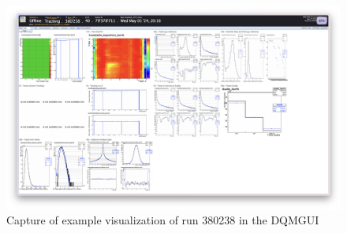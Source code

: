 \begin{figure}
    \centering
    \includegraphics[width=0.8\linewidth]{images/dqmgui.png}
    \caption{Capture of example visualization of run 380238 in the DQMGUI}
    \label{fig:dqmgui}
\end{figure}